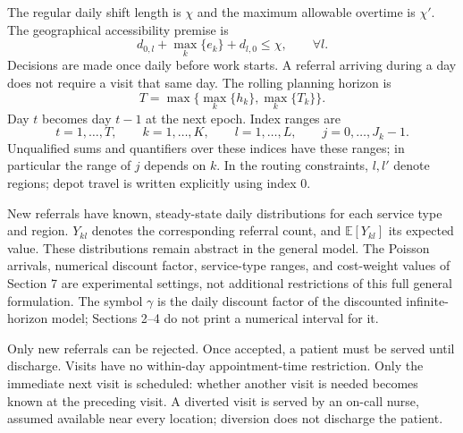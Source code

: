 \documentclass{article}
\begin{document}
The regular daily shift length is $\chi$ and the maximum allowable overtime is $\chi'$. The geographical accessibility premise is
\[
d_{0,l}+\max_k\{e_k\}+d_{l,0}\leq\chi,\qquad\forall l.
\]
Decisions are made once daily before work starts. A referral arriving during a day does not require a visit that same day. The rolling planning horizon is
\[
T=\max\{\max_k\{h_k\},\max_k\{T_k\}\}.
\]
Day $t$ becomes day $t-1$ at the next epoch. Index ranges are
\[
t=1,\ldots,T,\qquad k=1,\ldots,K,\qquad
l=1,\ldots,L,\qquad j=0,\ldots,J_k-1.
\]
Unqualified sums and quantifiers over these indices have these ranges; in particular the range of $j$ depends on $k$. In the routing constraints, $l,l'$ denote regions; depot travel is written explicitly using index $0$.

New referrals have known, steady-state daily distributions for each service type and region. $Y_{kl}$ denotes the corresponding referral count, and $\mathbb E[Y_{kl}]$ its expected value. These distributions remain abstract in the general model. The Poisson arrivals, numerical discount factor, service-type ranges, and cost-weight values of Section 7 are experimental settings, not additional restrictions of this full general formulation. The symbol $\gamma$ is the daily discount factor of the discounted infinite-horizon model; Sections 2--4 do not print a numerical interval for it.

Only new referrals can be rejected. Once accepted, a patient must be served until discharge. Visits have no within-day appointment-time restriction. Only the immediate next visit is scheduled: whether another visit is needed becomes known at the preceding visit. A diverted visit is served by an on-call nurse, assumed available near every location; diversion does not discharge the patient.
\end{document}
